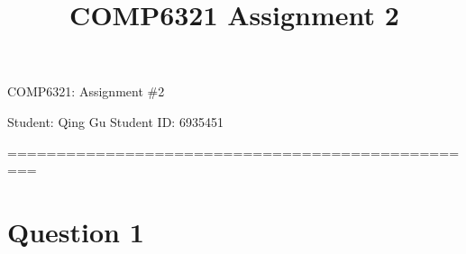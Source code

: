\documentclass[a4paper, 12pt, titlepage]{article}
\begin{document}
\title{COMP6321 Assignment 2}
\setcounter{tocdepth}{2}
\newpage
\begin{center}
    {\huge COMP6321: Assignment \#2}


    \vspace{2cm}
    Student: Qing Gu  \hspace{5cm}
    Student ID: 6935451
    \vspace{1cm}

    =================================================
\end{center}
\section{Question 1}
\end{document}
